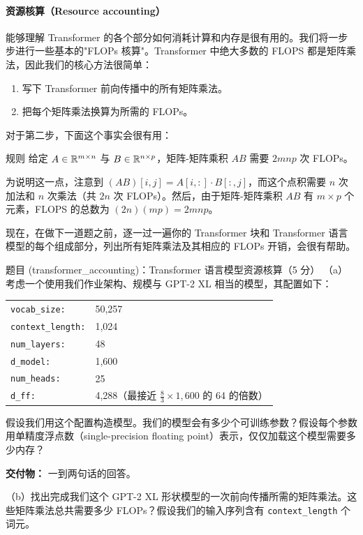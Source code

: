 \paragraph*{资源核算（Resource accounting）}
能够理解 Transformer 的各个部分如何消耗计算和内存是很有用的。我们将一步步进行一些基本的"FLOPs 核算"。Transformer 中绝大多数的 FLOPS 都是矩阵乘法，因此我们的核心方法很简单：

\begin{enumerate}[leftmargin=2.0em]
  \item 写下 Transformer 前向传播中的所有矩阵乘法。
  \item 把每个矩阵乘法换算为所需的 FLOPs。
\end{enumerate}

对于第二步，下面这个事实会很有用：

\begin{tipbox}{规则}
给定 $A \in \mathbb{R}^{m \times n}$ 与 $B \in \mathbb{R}^{n \times p}$，矩阵-矩阵乘积 $AB$ 需要 $2mnp$ 次 FLOPs。
\end{tipbox}

为说明这一点，注意到 $(AB)[i, j] = A[i, :] \cdot B[:, j]$，而这个点积需要 $n$ 次加法和 $n$ 次乘法（共 $2n$ 次 FLOPs）。然后，由于矩阵-矩阵乘积 $AB$ 有 $m \times p$ 个元素，FLOPS 的总数为 $(2n)(mp) = 2mnp$。

现在，在做下一道题之前，逐一过一遍你的 Transformer 块和 Transformer 语言模型的每个组成部分，列出所有矩阵乘法及其相应的 FLOPs 开销，会很有帮助。

\begin{problembox}{题目 (transformer\_accounting)：Transformer 语言模型资源核算（5 分）}
（a）考虑一个使用我们作业架构、规模与 GPT-2 XL 相当的模型，其配置如下：

\begin{center}
\begin{tabular}{ll}
\toprule
\texttt{vocab\_size:} & 50{,}257 \\
\texttt{context\_length:} & 1{,}024 \\
\texttt{num\_layers:} & 48 \\
\texttt{d\_model:} & 1{,}600 \\
\texttt{num\_heads:} & 25 \\
\texttt{d\_ff:} & 4{,}288（最接近 $\tfrac{8}{3} \times 1{,}600$ 的 64 的倍数）\\
\bottomrule
\end{tabular}
\end{center}

假设我们用这个配置构造模型。我们的模型会有多少个可训练参数？假设每个参数用单精度浮点数（single-precision floating point）表示，仅仅加载这个模型需要多少内存？

\textbf{交付物：} 一到两句话的回答。

（b）找出完成我们这个 GPT-2 XL 形状模型的一次前向传播所需的矩阵乘法。这些矩阵乘法总共需要多少 FLOPs？假设我们的输入序列含有 \texttt{context\_length} 个词元。
\end{problembox}
